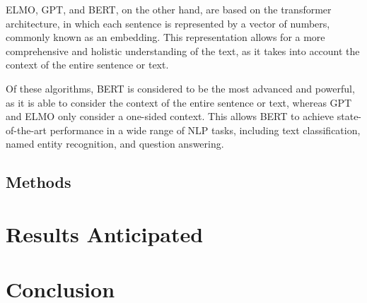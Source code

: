 \documentclass[PI]{ProjectProposal}
\begin{document}
ELMO, GPT, and BERT, on the other hand, are based on the transformer architecture, in which each sentence is represented by a vector of numbers, commonly known as an embedding. This representation allows for a more comprehensive and holistic understanding of the text, as it takes into account the context of the entire sentence or text.

Of these algorithms, BERT is considered to be the most advanced and powerful\autocite{devlin2018bert}, as it is able to consider the context of the entire sentence or text, whereas GPT and ELMO only consider a one-sided context. This allows BERT to achieve state-of-the-art performance in a wide range of NLP tasks, including text classification, named entity recognition, and question answering.
\section{Methods}
\label{sec:org1b039dc}

\chapter{Results Anticipated}
\label{sec:org55e2d9f}
\chapter{Conclusion}
\label{sec:orgb24e5c4}
\putbibliography
\appendix
\end{document}
